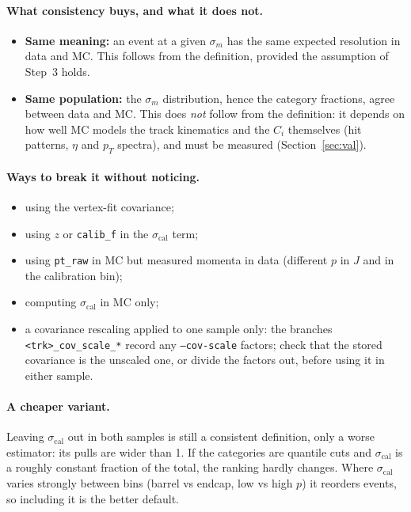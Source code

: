 \documentclass[11pt,a4paper]{article}
\newcommand{\br}[1]{\texttt{#1}}
\newcommand{\scal}{\sigma_{\mathrm{cal}}}
\begin{document}
\paragraph{What consistency buys, and what it does not.}
\begin{itemize}
  \item \textbf{Same meaning:} an event at a given $\sigma_m$ has the same expected resolution in data and MC.
        This follows from the definition, provided the assumption of Step~3 holds.
  \item \textbf{Same population:} the $\sigma_m$ distribution, hence the category fractions, agree between data
        and MC. This does \emph{not} follow from the definition: it depends on how well MC models the track
        kinematics and the $C_i$ themselves (hit patterns, $\eta$ and $p_T$ spectra), and must be measured
        (Section~\ref{sec:val}).
\end{itemize}

\paragraph{Ways to break it without noticing.}
\begin{itemize}
  \item using the vertex-fit covariance;
  \item using $z$ or \br{calib\_f} in the $\scal$ term;
  \item using \br{pt\_raw} in MC but measured momenta in data (different $p$ in $J$ and in the calibration bin);
  \item computing $\scal$ in MC only;
  \item a covariance rescaling applied to one sample only: the branches \br{<trk>\_cov\_scale\_*} record any
        \br{--cov-scale} factors; check that the stored covariance is the unscaled one, or divide the factors
        out, before using it in either sample.
\end{itemize}

\paragraph{A cheaper variant.} Leaving $\scal$ out in both samples is still a consistent definition, only a
worse estimator: its pulls are wider than 1. If the categories are quantile cuts and $\scal$ is a roughly
constant fraction of the total, the ranking hardly changes. Where $\scal$ varies strongly between bins (barrel
vs endcap, low vs high $p$) it reorders events, so including it is the better default.
\end{document}
